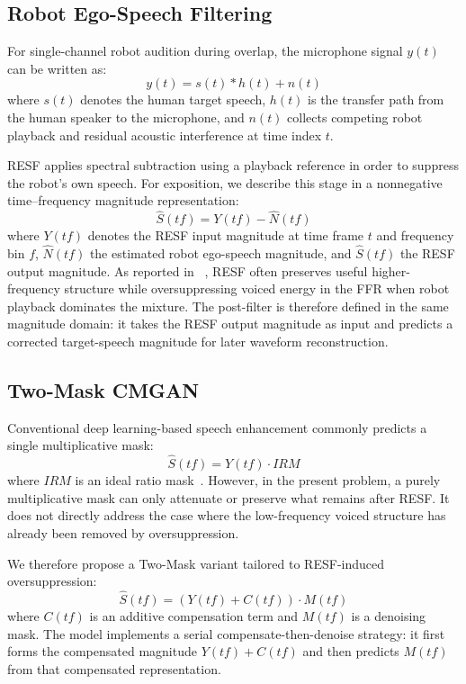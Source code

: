 \documentclass[manuscript,screen,review]{acmart}
\begin{document}
\subsection{Robot Ego-Speech Filtering}
For single-channel robot audition during overlap, the microphone signal $y(t)$ can be written as:
\begin{equation}
    y(t) = s(t)* h(t) + n(t)
\label{eq:1}
\end{equation}
where $s(t)$ denotes the human target speech, $h(t)$ is the transfer path from the human speaker to the microphone, and $n(t)$ collects competing robot playback and residual acoustic interference at time index $t$.

RESF applies spectral subtraction using a playback reference in order to suppress the robot's own speech. For exposition, we describe this stage in a nonnegative time--frequency magnitude representation:
\begin{equation}
    \hat{S}(tf) = Y(tf) -\hat{N}(tf)
\label{eq:2}
\end{equation}
where $Y(tf)$ denotes the RESF input magnitude at time frame $t$ and frequency bin $f$, $\hat{N}(tf)$ the estimated robot ego-speech magnitude, and $\hat{S}(tf)$ the RESF output magnitude. As reported in ~\cite{li2024near}, RESF often preserves useful higher-frequency structure while oversuppressing voiced energy in the FFR when robot playback dominates the mixture. The post-filter is therefore defined in the same magnitude domain: it takes the RESF output magnitude as input and predicts a corrected target-speech magnitude for later waveform reconstruction.

\subsection{Two-Mask CMGAN}
Conventional deep learning-based speech enhancement commonly predicts a single multiplicative mask:
\begin{equation}
    \hat{S}(tf) = Y(tf) \cdot IRM
\label{eq:3}
\end{equation}
where $IRM$ is an ideal ratio mask~\cite{wali2022generative}. However, in the present problem, a purely multiplicative mask can only attenuate or preserve what remains after RESF. It does not directly address the case where the low-frequency voiced structure has already been removed by oversuppression.

We therefore propose a Two-Mask variant tailored to RESF-induced oversuppression:
\begin{equation}
    \hat{S}(tf) = (Y(tf)+C(tf)) \cdot M(tf)
\label{eq:7}
\end{equation}
where $C(tf)$ is an additive compensation term and $M(tf)$ is a denoising mask. The model implements a serial compensate-then-denoise strategy: it first forms the compensated magnitude $Y(tf)+C(tf)$ and then predicts $M(tf)$ from that compensated representation.
\end{document}
